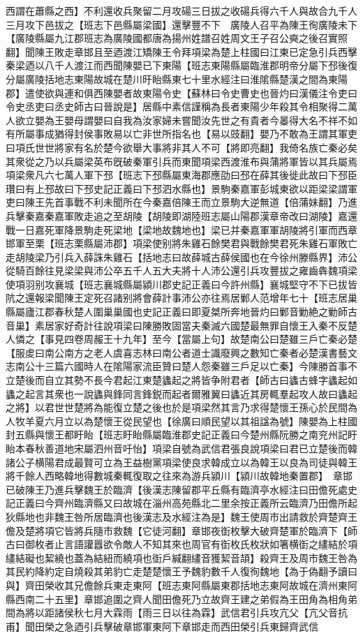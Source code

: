 西謂在蕭縣之西】不利還收兵聚留二月攻碭三日拔之收碭兵得六千人與故合九千人三月攻下邑拔之【班志下邑縣屬梁國】還擊豐不下　廣陵人召平為陳王徇廣陵未下【廣陵縣屬九江郡班志為廣陵國都唐為揚州姓譜召姓周文王子召公奭之後召實照翻】聞陳王敗走章邯且至迺渡江矯陳王令拜項梁為楚上柱國曰江東已定急引兵西擊秦梁迺以八千人渡江而西聞陳嬰已下東陽【班志東陽縣屬臨淮郡明帝分屬下邳後復分屬廣陵括地志東陽故城在楚川旴眙縣東七十里水經注曰淮隂縣楚漢之間為東陽郡】遣使欲與連和俱西陳嬰者故東陽令史【蘇林曰令史曹史也晉灼曰漢儀注令吏曰令史丞吏曰丞史師古曰晉說是】居縣中素信謹稱為長者東陽少年殺其令相聚得二萬人欲立嬰為王嬰母謂嬰曰自我為汝家婦未嘗聞汝先世之有貴者今㬥得大名不祥不如有所屬事成猶得封侯事敗易以亡非世所指名也【易以豉翻】嬰乃不敢為王謂其軍吏曰項氏世世將家有名於楚今欲舉大事將非其人不可【將即亮翻】我倚名族亡秦必矣其衆從之乃以兵屬梁英布旣破秦軍引兵而東聞項梁西渡淮布與蒲將軍皆以其兵屬焉項梁衆凡六七萬人軍下邳【班志下邳縣屬東海郡應劭曰邳在薛其後徙此故曰下邳臣瓚曰有上邳故曰下邳史記正義曰下邳泗水縣也】景駒秦嘉軍彭城東欲以距梁梁謂軍吏曰陳王先首事戰不利未聞所在今秦嘉倍陳王而立景駒大逆無道【倍蒲妹翻】乃進兵擊秦嘉秦嘉軍敗走追之至胡陵【胡陵即湖陸班志屬山陽郡漢章帝改曰湖陵】嘉還戰一日嘉死軍降景駒走死梁地【梁地故魏地也】梁已并秦嘉軍軍胡陵將引軍而西章邯軍至栗【班志栗縣屬沛郡】項梁使别將朱雞石餘樊君與戰餘樊君死朱雞石軍敗亡走胡陵梁乃引兵入薛誅朱雞石【括地志曰故薛城古薛侯國也在今徐州滕縣界】沛公從騎百餘往見梁梁與沛公卒五千人五大夫將十人沛公還引兵攻豐拔之雍齒犇魏項梁使項羽别攻襄城【班志襄城縣屬潁川郡史記正義曰今許州縣】襄城堅守不下已拔皆阬之還報梁聞陳王定死召諸别將會薛計事沛公亦往焉居鄛人范增年七十【班志居巢縣屬廬江郡春秋楚人圍巢巢國也史記正義曰即夏桀所奔地晉灼曰鄛音勦絶之勦師古音巢】素居家好奇計往說項梁曰陳勝敗固當夫秦滅六國楚最無罪自懷王入秦不反楚人憐之【事見四卷周赧王十九年】至今【當屬上句】故楚南公曰楚雖三戶亡秦必楚【服䖍曰南公南方之老人虞喜志林曰南公者道士識廢興之數知亡秦者必楚漢書藝文志南公十三篇六國時人在隂陽家流臣贊曰楚人怨秦雖三戶足以亡秦】今陳勝首事不立楚後而自立其勢不長今君起江東楚蠭起之將皆争附君者【師古曰蠭古蜂字蠭起如蠭之起言其衆也一說蠭與鋒同言鋒鋭而起者爾雅翼曰蠭近其房輒羣起攻人故曰蠭起之將】以君世世楚將為能復立楚之後也於是項梁然其言乃求得楚懷王孫心於民間為人牧羊夏六月立以為楚懷王從民望也【徐廣曰順民望以其祖諡為號】陳嬰為上柱國封五縣與懷王都盱眙【班志盱眙縣屬臨淮郡史記正義曰今楚州縣阮勝之南兖州記盱眙本春秋善道地宋屬泗州音吁怡】項梁自號為武信君張良說項梁曰君已立楚後而韓諸公子横陽君成最賢可立為王益樹黨項梁使良求韓成立以為韓王以良為司徒與韓王將千餘人西略韓地得數城秦輒復取之往來為游兵潁川【潁川故韓地秦置郡】　章邯已破陳王乃進兵擊魏王於臨濟【後漢志陳留郡平丘縣有臨濟亭水經注曰田儋死處史記正義曰今齊州臨濟縣又曰故城在淄州高苑縣北二里余按正義所云臨濟乃田儋所起狄縣地也非魏王咎所居臨濟也後漢志及水經注為是】魏王使周市出請救於齊楚齊王儋及楚將項它皆將兵隨市救魏【它徒河翻】章邯夜衘枚擊大破齊楚軍於臨濟下【師古曰御枚者止言語讙囂欲令敵人不知其來也周官有衘枚氏枚狀如箸横衘之繣結於項繣結礙也絜繞也蓋為結紐而繞項也衘戶緘翻繣音獲絜音頡】殺齊王及周市魏王咎為其民約降約定自燒殺其弟豹亡走楚楚懷王予魏豹數千人復徇魏地【為于偽翻予讀曰與】齊田榮收其兄儋餘兵東走東阿【班志東阿縣屬東郡括地志東阿故城在濟州東阿縣西南二十五里】章邯追圍之齊人聞田儋死乃立故齊王建之弟假為王田角為相角弟間為將以距諸侯秋七月大霖雨【雨三日以往為霖】武信君引兵攻亢父【亢父音抗甫】聞田榮之急迺引兵擊破章邯軍東阿下章邯走而西田榮引兵東歸齊武信